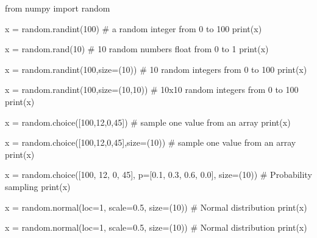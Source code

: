 \documentclass[
  letterpaper,
  DIV=11,
  numbers=noendperiod]{scrreprt}
\newenvironment{Shaded}{\begin{snugshade}}{\end{snugshade}}
\newcommand{\BuiltInTok}[1]{\textcolor[rgb]{0.00,0.23,0.31}{#1}}
\newcommand{\CommentTok}[1]{\textcolor[rgb]{0.37,0.37,0.37}{#1}}
\newcommand{\DecValTok}[1]{\textcolor[rgb]{0.68,0.00,0.00}{#1}}
\newcommand{\FloatTok}[1]{\textcolor[rgb]{0.68,0.00,0.00}{#1}}
\newcommand{\ImportTok}[1]{\textcolor[rgb]{0.00,0.46,0.62}{#1}}
\newcommand{\NormalTok}[1]{\textcolor[rgb]{0.00,0.23,0.31}{#1}}
\newcommand{\OperatorTok}[1]{\textcolor[rgb]{0.37,0.37,0.37}{#1}}
\begin{document}
\begin{Shaded}
\begin{Highlighting}[]
\ImportTok{from}\NormalTok{ numpy }\ImportTok{import}\NormalTok{ random}

\NormalTok{x }\OperatorTok{=}\NormalTok{ random.randint(}\DecValTok{100}\NormalTok{) }\CommentTok{\# a random integer from 0 to 100}
\BuiltInTok{print}\NormalTok{(x)}

\NormalTok{x }\OperatorTok{=}\NormalTok{ random.rand(}\DecValTok{10}\NormalTok{) }\CommentTok{\# 10 random numbers float from 0 to 1}
\BuiltInTok{print}\NormalTok{(x)}

\NormalTok{x }\OperatorTok{=}\NormalTok{ random.randint(}\DecValTok{100}\NormalTok{,size}\OperatorTok{=}\NormalTok{(}\DecValTok{10}\NormalTok{)) }\CommentTok{\# 10 random integers from 0 to 100}
\BuiltInTok{print}\NormalTok{(x)}

\NormalTok{x }\OperatorTok{=}\NormalTok{ random.randint(}\DecValTok{100}\NormalTok{,size}\OperatorTok{=}\NormalTok{(}\DecValTok{10}\NormalTok{,}\DecValTok{10}\NormalTok{)) }\CommentTok{\# 10x10 random integers from 0 to 100}
\BuiltInTok{print}\NormalTok{(x)}

\NormalTok{x }\OperatorTok{=}\NormalTok{ random.choice([}\DecValTok{100}\NormalTok{,}\DecValTok{12}\NormalTok{,}\DecValTok{0}\NormalTok{,}\DecValTok{45}\NormalTok{]) }\CommentTok{\# sample one value from an array}
\BuiltInTok{print}\NormalTok{(x)}

\NormalTok{x }\OperatorTok{=}\NormalTok{ random.choice([}\DecValTok{100}\NormalTok{,}\DecValTok{12}\NormalTok{,}\DecValTok{0}\NormalTok{,}\DecValTok{45}\NormalTok{],size}\OperatorTok{=}\NormalTok{(}\DecValTok{10}\NormalTok{)) }\CommentTok{\# sample one value from an array}
\BuiltInTok{print}\NormalTok{(x)}

\NormalTok{x }\OperatorTok{=}\NormalTok{ random.choice([}\DecValTok{100}\NormalTok{, }\DecValTok{12}\NormalTok{, }\DecValTok{0}\NormalTok{, }\DecValTok{45}\NormalTok{], p}\OperatorTok{=}\NormalTok{[}\FloatTok{0.1}\NormalTok{, }\FloatTok{0.3}\NormalTok{, }\FloatTok{0.6}\NormalTok{, }\FloatTok{0.0}\NormalTok{], size}\OperatorTok{=}\NormalTok{(}\DecValTok{10}\NormalTok{)) }\CommentTok{\# Probability sampling}
\BuiltInTok{print}\NormalTok{(x)}

\NormalTok{x }\OperatorTok{=}\NormalTok{ random.normal(loc}\OperatorTok{=}\DecValTok{1}\NormalTok{, scale}\OperatorTok{=}\FloatTok{0.5}\NormalTok{, size}\OperatorTok{=}\NormalTok{(}\DecValTok{10}\NormalTok{)) }\CommentTok{\# Normal distribution}
\BuiltInTok{print}\NormalTok{(x)}

\NormalTok{x }\OperatorTok{=}\NormalTok{ random.normal(loc}\OperatorTok{=}\DecValTok{1}\NormalTok{, scale}\OperatorTok{=}\FloatTok{0.5}\NormalTok{, size}\OperatorTok{=}\NormalTok{(}\DecValTok{10}\NormalTok{)) }\CommentTok{\# Normal distribution}
\BuiltInTok{print}\NormalTok{(x)}
\end{Highlighting}
\end{Shaded}
\end{document}
